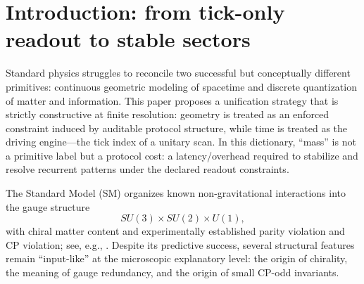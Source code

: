 
\section{Introduction: from tick-only readout to stable sectors}
\label{sec:introduction}

Standard physics struggles to reconcile two successful but conceptually different primitives: continuous geometric modeling of spacetime and discrete quantization of matter and information.
This paper proposes a unification strategy that is strictly constructive at finite resolution: geometry is treated as an enforced constraint induced by auditable protocol structure, while time is treated as the driving engine---the tick index of a unitary scan.
In this dictionary, ``mass'' is not a primitive label but a protocol cost: a latency/overhead required to stabilize and resolve recurrent patterns under the declared readout constraints.

\begin{center}
\end{center}

The Standard Model (SM) organizes known non-gravitational interactions into the gauge structure
\[
SU(3)\times SU(2)\times U(1),
\]
with chiral matter content and experimentally established parity violation and CP violation; see, e.g., \cite{PeskinSchroeder1995,PDGRPP2024}.
Despite its predictive success, several structural features remain ``input-like'' at the microscopic explanatory level: the origin of chirality, the meaning of gauge redundancy, and the origin of small CP-odd invariants.

